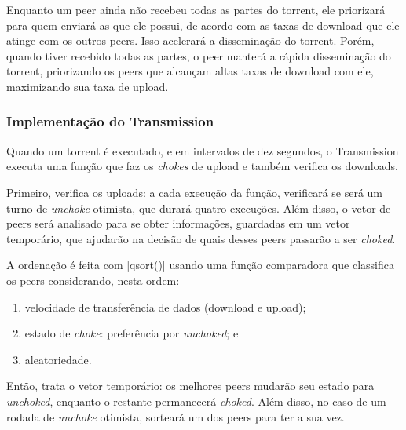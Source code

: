 Enquanto um \gls*{peer} ainda não recebeu todas as partes do \gls*{torrent}, ele
priorizará para quem enviará as que ele possui, de acordo com as taxas de download que
ele atinge com os outros \glspl*{peer}. Isso acelerará a disseminação do \gls*{torrent}.
Porém, quando tiver recebido todas as partes, o \gls*{peer} manterá a rápida
disseminação do \gls*{torrent}, priorizando os \glspl*{peer} que alcançam altas taxas de
download com ele, maximizando sua taxa de upload.

\subsubsection*{Implementação do Transmission}

Quando um \gls*{torrent} é executado, e em intervalos de dez segundos, o Transmission
executa uma função que faz os \emph{chokes} de upload e também verifica os downloads.


Primeiro, verifica os uploads: a cada execução da função, verificará se será um turno de
\emph{unchoke} otimista, que durará quatro execuções. Além disso, o vetor de
\glspl*{peer} será analisado para se obter informações, guardadas em um vetor
temporário, que ajudarão na decisão de quais desses \glspl*{peer} passarão a ser
\emph{choked}.


A ordenação é feita com \sverb|qsort()| usando uma função comparadora que classifica os
\glspl*{peer} considerando, nesta ordem:

\begin{enumerate}
    \item velocidade de transferência de dados (download e upload);
    \item estado de \emph{choke}: preferência por \emph{unchoked}; e
    \item aleatoriedade.
\end{enumerate}


Então, trata o vetor temporário: os melhores \glspl*{peer} mudarão seu estado para
\emph{unchoked}, enquanto o restante permanecerá \emph{choked}. Além disso, no caso de
um rodada de \emph{unchoke} otimista, sorteará um dos \glspl*{peer} para ter a sua vez.

